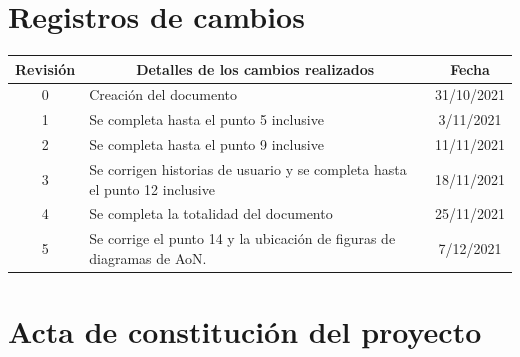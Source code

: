 \documentclass[
11pt, %
]{charter}
\begin{document}
\maketitle
\thispagestyle{empty}
\pagebreak


\thispagestyle{empty}
{\setlength{\parskip}{0pt}
\tableofcontents{}
}
\pagebreak


\section*{Registros de cambios}
\label{sec:registro}


\begin{table}[ht]
\label{tab:registro}
\centering
\begin{tabularx}{\linewidth}{@{}|c|X|c|@{}}
\hline
\rowcolor[HTML]{C0C0C0} 
Revisión & \multicolumn{1}{c|}{\cellcolor[HTML]{C0C0C0}Detalles de los cambios realizados} & Fecha      \\ \hline
0      & Creación del documento                                 & 31/10/2021 \\ \hline
1      & Se completa hasta el punto 5 inclusive                 & 3/11/2021 \\ \hline
2      & Se completa hasta el punto 9 inclusive
& 11/11/2021 \\ \hline
3      & Se corrigen historias de usuario y se completa hasta el punto 12 inclusive
& 18/11/2021 \\ \hline
4      & Se completa la totalidad del documento
& 25/11/2021 \\ \hline
5      & Se corrige el punto 14 y la ubicación de figuras de diagramas de AoN.
& 7/12/2021 \\ \hline
\end{tabularx}
\end{table}

\pagebreak



\section*{Acta de constitución del proyecto}
\label{sec:acta}
\end{document}
